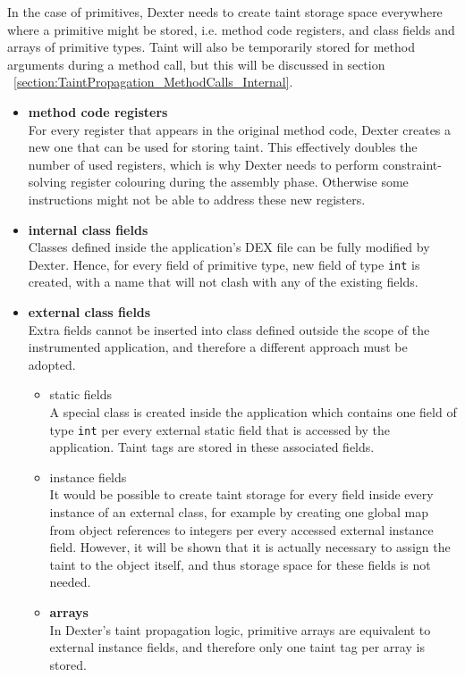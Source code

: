 \documentclass[12pt,twoside,notitlepage]{report}
\begin{document}
\label{section:TaintStorage_Primitives}

In the case of primitives, Dexter needs to create taint storage space everywhere where a primitive might be stored, i.e. method code registers, and class fields and arrays of primitive types. Taint will also be temporarily stored for method arguments during a method call, but this will be discussed in section ~\ref{section:TaintPropagation_MethodCalls_Internal}.

\begin{itemize}

\item \textbf{method code registers} \\
For every register that appears in the original method code, Dexter creates a new one that can be used for storing taint. This effectively doubles the number of used registers, which is why Dexter needs to perform constraint-solving register colouring during the assembly phase. Otherwise some instructions might not be able to address these new registers.

\item \textbf{internal class fields} \\
Classes defined inside the application's DEX file can be fully modified by Dexter. Hence, for every field of primitive type, new field of type \verb$int$ is created, with a name that will not clash with any of the existing fields.

\item \textbf{external class fields} \\
Extra fields cannot be inserted into class defined outside the scope of the instrumented application, and therefore a different approach must be adopted. 
\begin{itemize}
\item static fields \\
A special class is created inside the application which contains one field of type \verb$int$ per every external static field that is accessed by the application. Taint tags are stored in these associated fields.

\item instance fields \\
It would be possible to create taint storage for every field inside every instance of an external class, for example by creating one global map from object references to integers per every accessed external instance field. However, it will be shown that it is actually necessary to assign the taint to the object itself, and thus storage space for these fields is not needed.

\item \textbf{arrays} \\
In Dexter's taint propagation logic, primitive arrays are equivalent to external instance fields, and therefore only one taint tag per array is stored.

\end{itemize}

\end{itemize}
\end{document}
